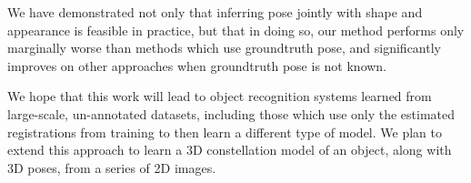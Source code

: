 We have demonstrated not only that inferring pose jointly with shape and appearance is feasible in practice, but that in doing so, our method performs only marginally worse than methods which use groundtruth pose, and significantly improves on other approaches when groundtruth pose is not known.

We hope that this work will lead to object recognition systems learned from large-scale, un-annotated datasets, including those which use only the estimated registrations from training to then learn a different type of model. We plan to extend this approach to learn a 3D constellation model of an object, along with 3D poses, from a series of 2D images.
